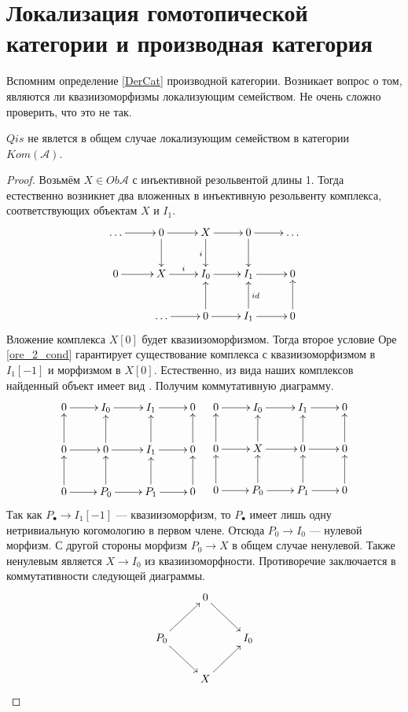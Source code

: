 \documentclass[../hw_main.tex]{subfiles}
\begin{document}
\section{Локализация гомотопической категории и производная категория}
Вспомним определение \ref{DerCat} производной категории. 
Возникает вопрос о том, являются ли квазиизоморфизмы локализующим семейством. 
Не очень сложно проверить, что это не так.
\begin{to_suj}\label{Kom_Qis_counterex}
$Qis$ не явлется в общем случае локализующим семейством в категории $Kom(\mathcal{A})$.
\end{to_suj}
\begin{proof}
Возьмём $X\in Ob\mathcal{A}$ с инъективной резольвентой длины 1. 
Тогда естественно возникнет два вложенных в инъективную резольвенту комплекса, соответствующих объектам $X$ и $I_1$.
\begin{equation*}
\xymatrix{
\ldots\ar[r]&0\ar[r]\ar[d]&X\ar[r]\ar[d]_i&0\ar[d]\ar[r]&\ldots\\
0\ar[r]&X\ar[r]^i&I_0\ar[r]&I_1\ar[r]&0\\
&\ldots\ar[r]&0\ar[r]\ar[u]&I_1\ar[u]_{id}\ar[r]&0\ar[u]
}
\end{equation*}
Вложение комплекса $X[0]$ будет квазиизоморфизмом. 
Тогда второе условие Оре \eqref{ore_2_cond} гарантирует существование комплекса с квазиизоморфизмом в $I_1[-1]$ и морфизмом в $X[0]$. 
Естественно, из вида наших комплексов найденный объект имеет вид . Получим коммутативную диаграмму.
\begin{equation*}
    \xymatrix{0\ar[r]&I_0\ar[r]&I_1\ar[r]&0\\
    0\ar[u]\ar[r]&0\ar[u]\ar[r]&I_1\ar[r]\ar[u]&0\ar[u]\\
    0\ar[u]\ar[r]&P_0\ar[r]\ar[u]&P_1\ar[r]\ar[u]&0\ar[u]}\quad
    \xymatrix{0\ar[r]&I_0\ar[r]&I_1\ar[r]&0\\
    0\ar[u]\ar[r]&X\ar[u]\ar[r]&0\ar[r]\ar[u]&0\ar[u]\\
    0\ar[u]\ar[r]&P_0\ar[r]\ar[u]&P_1\ar[r]\ar[u]&0\ar[u]}
\end{equation*}
Так как $P_\bullet\to I_1[-1]$ --- квазиизоморфизм, то $P_\bullet$ имеет лишь одну нетривиальную когомологию в первом члене. Отсюда $P_0\to I_0$ --- нулевой морфизм.
С другой стороны морфизм $P_0\to X$ в общем случае ненулевой. Также ненулевым является $X\to I_0$ из квазиизоморфности. Противоречие заключается в коммутативности следующей диаграммы.
\begin{equation*}
    \xymatrix{&0\ar[rd]\\
    P_0\ar[ru]\ar[rd]&&I_0\\
    &X\ar[ru]}
\end{equation*}
\end{proof}
\end{document}
